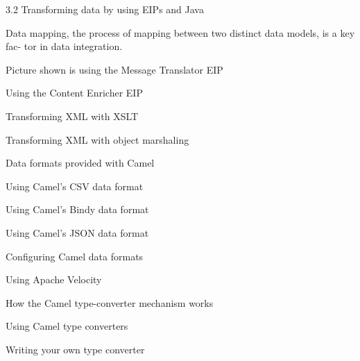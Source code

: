\documentclass[Screen16to9,17pt]{foils}
\begin{document}


\begin{list2}

\item 3.2 Transforming data by using EIPs and Java
\item Data mapping, the process of mapping between two distinct data models, is a key fac-
tor in data integration.
\item Picture shown is using the Message Translator EIP
\end{list2}


\begin{list2}

\item Using the Content Enricher EIP
\end{list2}




\begin{list2}
\item Transforming XML with XSLT
\item Transforming XML with object marshaling
\end{list2}





\begin{list2}
\item Data formats provided with Camel
\item Using Camel’s CSV data format
\item Using Camel’s Bindy data format
\item Using Camel’s JSON data format
\item Configuring Camel data formats
\end{list2}


\begin{list2}
\item Using Apache Velocity
\end{list2}



\begin{list2}
\item How the Camel type-converter mechanism works
\item Using Camel type converters
\item Writing your own type converter
\end{list2}
\end{document}
